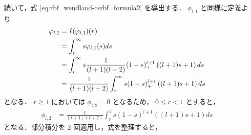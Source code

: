 続いて，式 \eqref{eq:rbf_wendland-csrbf_formula2} を導出する．
$\phi_{l,1}$ と同様に定義より
\begin{align}
    \phi_{l,2}
     & = I (\phi_{l,1}) (r)
    \notag                                                                                 \\
     & = \int_r^\infty s \phi_{l,1}(s) ds
    \notag                                                                                 \\
     & = \int_r^\infty s \frac{1}{(l+1)(l+2)} (1 - s)_+^{l+1} \left( (l+1)s + 1 \right) ds
    \notag                                                                                 \\
     & = \frac{1}{(l+1)(l+2)} \int_r^\infty s (1 - s)_+^{l+1} \left( (l+1)s + 1 \right) ds
\end{align}
となる．
$r \ge 1$ においては $\phi_{l,2} = 0$ となるため，
$0 \le r < 1$ とすると，
\begin{align}
    \phi_{l,2}
     & = \frac{1}{(l+1)(l+2)} \int_r^1 s (1 - s)^{l+1} \left( (l+1)s + 1 \right) ds
\end{align}
となる．部分積分を 2 回適用し，式を整理すると，
